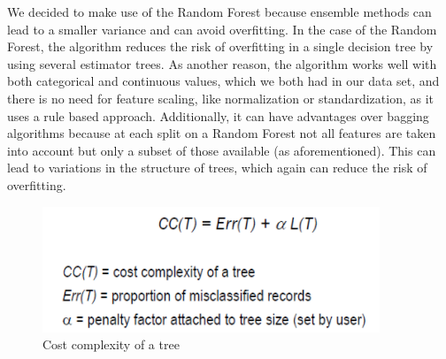 We decided to make use of the Random Forest because ensemble methods can lead to a smaller variance and can avoid overfitting. In the case of the Random Forest, the algorithm reduces the risk of overfitting in a single decision tree by using several estimator trees. As another reason, the algorithm works well with both categorical and continuous values, which we both had in our data set, and there is no need for feature scaling, like normalization or standardization, as it uses a rule based approach. Additionally, it can have advantages over bagging algorithms because at each split on a Random Forest not all features are taken into account but only a subset of those available (as aforementioned). This can lead to variations in the structure of trees, which again can reduce the risk of overfitting.

\begin{figure}[H]
   \centering
    \includegraphics[width=0.4\linewidth]{./Figures/Fig_CC.png}
    \caption{Cost complexity of a tree}
    \label{Fig_CC}
\end{figure}









